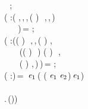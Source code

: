 \begin{holmath}
\,\,\,\,\,\,\,;\\
\,\,\,( :(\,\HOLTokenProd{}\,,\,,\,,\,(\,\HOLTokenProd{}\,)\,\HOLTokenProd{}\,\,\HOLTokenProd{}\,,\,,\,)\\
\,\,\,\,\,\,\,\,\,\,\,\,\,)\,=\,\,;\\
\,\,\,( :((\,\HOLTokenProd{}\,)\,\HOLTokenProd{}\,\,\HOLTokenProd{}\,,\,,\,(\,\HOLTokenProd{}\,)\,\HOLTokenProd{}\,,\\
\,\,\,\,\,\,\,\,\,\,\,\,\,\,((\,\HOLTokenProd{}\,)\,\HOLTokenProd{}\,\,\HOLTokenProd{}\,)\,\HOLTokenProd{}\,(\,\HOLTokenProd{}\,)\,\HOLTokenProd{}\,\,\HOLTokenProd{}\,,\\
\,\,\,\,\,\,\,\,\,\,\,\,\,\,(\,\HOLTokenProd{}\,)\,\HOLTokenProd{}\,,\,)\,)\,=\,\,;\\
\,\,\,( :)\,=\,\,\,\ensuremath{\HOLBoundVar{e}\sb{\mathrm{1}}}\,(\,\,(\,\,\ensuremath{\HOLBoundVar{e}\sb{\mathrm{1}}}\,\ensuremath{\HOLBoundVar{e}\sb{\mathrm{2}}})\,\ensuremath{\HOLBoundVar{e}\sb{\mathrm{1}}})\\
\,\\
\,\,\,.\,(\HOLSymConst{,}\HOLSymConst{,}\HOLSymConst{,}))
\end{holmath}  

